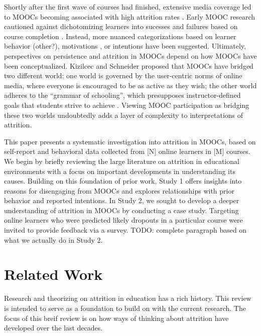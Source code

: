 \documentclass{sigchi}\usepackage[]{graphicx}\usepackage[]{color}
\begin{document}
Shortly after the first wave of courses had finished, extensive media coverage led to MOOCs becoming associated with high attrition rates \cite{lewin2013after,parr2013mooc,guthrie2013moocs}. Early MOOC research cautioned against dichotomizing learners into sucesses and failures based on course completion \cite{kizilcec2013deconstructing,rivard2013measuring}. Instead, more nuanced categorizations based on learner behavior \cite{kizilcec2013deconstructing,clow2013moocs} (other?), motivations \cite{kizilcec2015motivation}, or intentions \cite{wilkowski2014student} have been suggested. Ultimately, perspectives on persistence and attrition in MOOCs depend on how MOOCs have been conceptualized. Kizilcec and Schneider \citeyear{kizilcec2015motivation} proposed that MOOCs have bridged two different world: one world is governed by the user-centric norms of online media, where everyone is encouraged to be as active as they wish; the other world adheres to the ``grammar of schooling'', which presupposes instructor-defined goals that students strive to achieve \cite{tyack1994grammar}. Viewing MOOC participation as bridging these two worlds undoubtedly adds a layer of complexity to interpretations of attrition.

This paper presents a systematic investigation into attrition in MOOCs, based on self-report and behavioral data collected from [N] online learners in [M] courses. We begin by briefly reviewing the large literature on attrition in educational environments with a focus on important developments in understanding its causes. Building on this foundation of prior work, Study 1 offers insights into reasons for disengaging from MOOCs and explores relationships with prior behavior and reported intentions. In Study 2, we sought to develop a deeper understanding of attrition in MOOCs by conducting a case study. Targeting online learners who were predicted likely dropouts in a particular course were invited to provide feedback via a survey. 
TODO: complete paragraph based on what we actually do in Study 2.


\section{Related Work}

Research and theorizing on attrition in education has a rich history. This review is intended to serve as a foundation to build on with the current research. The focus of this breif review is on how ways of thinking about attrition have developed over the last decades.
\end{document}
